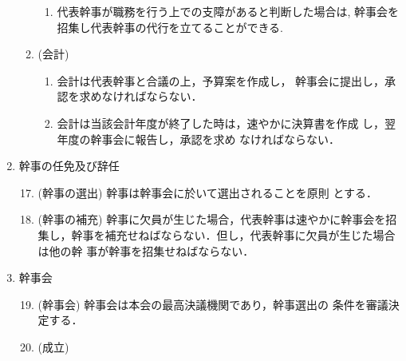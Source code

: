 \begin{enumerate}
\begin{enumerate}
\begin{enumerate}
	\item	代表幹事が職務を行う上での支障があると判断した場合は,
幹事会を招集し代表幹事の代行を立てることができる. \\
\end{enumerate}
%
\item	(会計)
\begin{enumerate}
	\item	会計は代表幹事と合議の上，予算案を作成し，
				幹事会に提出し，承認を求めなければならない．\\
	\item	会計は当該会計年度が終了した時は，速やかに決算書を作成
				し，翌年度の幹事会に報告し，承認を求め
なければならない．\\
\end{enumerate}
%
\end{enumerate}
%
\newpage
\item	幹事の任免及び辞任\\
%
\begin{enumerate}
\setcounter{enumii}{16}
\item	(幹事の選出) 幹事は幹事会に於いて選出されることを原則
				とする．\\
%
\item (幹事の補充) 幹事に欠員が生じた場合，代表幹事は速やかに幹事会を招
集し，幹事を補充せねばならない．但し，代表幹事に欠員が生じた場合は他の幹
事が幹事を招集せねばならない．\\
\end{enumerate}
%
\item    幹事会\\
%
\begin{enumerate}
\setcounter{enumii}{18}
\item    (幹事会) 幹事会は本会の最高決議機関であり，幹事選出の
                条件を審議決定する．\\
%
\item    (成立) 
\begin{enumerate}

\end{enumerate}
\end{enumerate}
\end{enumerate}
